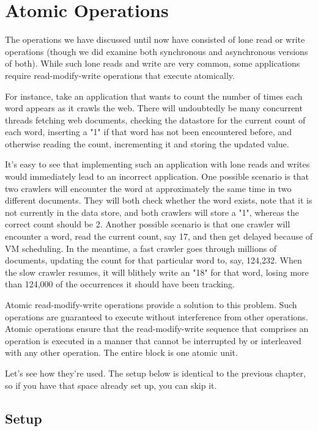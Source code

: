 \chapter{Atomic Operations}
\label{chap:atomic-ops}

The operations we have discussed until now have consisted of lone read or write
operations (though we did examine both synchronous and asynchronous versions of
both). While such lone reads and write are very common, some applications
require read-modify-write operations that execute atomically.

For instance, take an application that wants to count the number of times each
word appears as it crawls the web. There will undoubtedly be many concurrent
threads fetching web documents, checking the datastore for the current count of
each word, inserting a "1" if that word has not been encountered before, and
otherwise reading the count, incrementing it and storing the updated value.

It's easy to see that implementing such an application with lone reads and
writes would immediately lead to an incorrect application.  One possible
scenario is that two crawlers will encounter the word at approximately the same
time in two different documents. They will both check whether the word exists,
note that it is not currently in the data store, and both crawlers will store a
"1", whereas the correct count should be 2. Another possible scenario is that
one crawler will encounter a word, read the current count, say 17, and then get
delayed because of VM scheduling. In the meantime, a fast crawler goes through
millions of documents, updating the count for that particular word to, say,
124,232. When the slow crawler resumes, it will blithely write an "18" for that
word, losing more than 124,000 of the occurrences it should have been tracking.

Atomic read-modify-write operations provide a solution to this problem.  Such
operations are guaranteed to execute without interference from other operations.
Atomic operations ensure that the read-modify-write sequence that comprises an
operation is executed in a manner that cannot be interrupted by or interleaved
with any other operation. The entire block is one atomic unit.

Let's see how they're used. The setup below is identical to the previous
chapter, so if you have that space already set up, you can skip it.

\section{Setup}
\label{sec:atomic-ops:setup}

